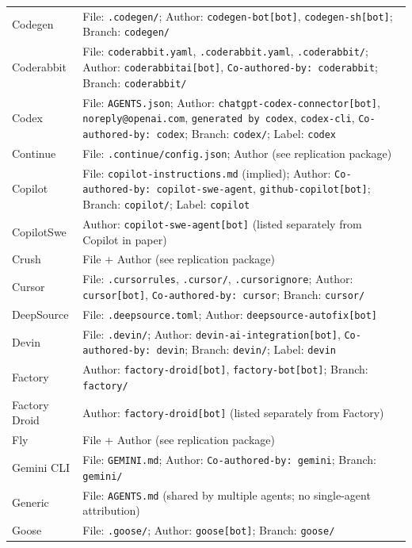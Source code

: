 \begin{small}
\begin{longtable}{@{}p{3.0cm}p{11.5cm}@{}}
Codegen          & File: \texttt{.codegen/}; Author: \texttt{codegen-bot[bot]}, \texttt{codegen-sh[bot]}; Branch: \texttt{codegen/} \\
Coderabbit       & File: \texttt{coderabbit.yaml}, \texttt{.coderabbit.yaml}, \texttt{.coderabbit/}; Author: \texttt{coderabbitai[bot]}, \texttt{Co-authored-by: coderabbit}; Branch: \texttt{coderabbit/} \\
Codex            & File: \texttt{AGENTS.json}; Author: \texttt{chatgpt-codex-connector[bot]}, \texttt{noreply@openai.com}, \texttt{generated by codex}, \texttt{codex-cli}, \texttt{Co-authored-by: codex}; Branch: \texttt{codex/}; Label: \texttt{codex} \\
Continue         & File: \texttt{.continue/config.json}; Author (see replication package) \\
Copilot          & File: \texttt{copilot-instructions.md} (implied); Author: \texttt{Co-authored-by: copilot-swe-agent}, \texttt{github-copilot[bot]}; Branch: \texttt{copilot/}; Label: \texttt{copilot} \\
CopilotSwe       & Author: \texttt{copilot-swe-agent[bot]} (listed separately from Copilot in paper) \\
Crush            & File + Author (see replication package) \\
Cursor           & File: \texttt{.cursorrules}, \texttt{.cursor/}, \texttt{.cursorignore}; Author: \texttt{cursor[bot]}, \texttt{Co-authored-by: cursor}; Branch: \texttt{cursor/} \\
DeepSource       & File: \texttt{.deepsource.toml}; Author: \texttt{deepsource-autofix[bot]} \\
Devin            & File: \texttt{.devin/}; Author: \texttt{devin-ai-integration[bot]}, \texttt{Co-authored-by: devin}; Branch: \texttt{devin/}; Label: \texttt{devin} \\
Factory          & Author: \texttt{factory-droid[bot]}, \texttt{factory-bot[bot]}; Branch: \texttt{factory/} \\
Factory Droid    & Author: \texttt{factory-droid[bot]} (listed separately from Factory) \\
Fly              & File + Author (see replication package) \\
Gemini CLI       & File: \texttt{GEMINI.md}; Author: \texttt{Co-authored-by: gemini}; Branch: \texttt{gemini/} \\
Generic          & File: \texttt{AGENTS.md} (shared by multiple agents; no single-agent attribution) \\
Goose            & File: \texttt{.goose/}; Author: \texttt{goose[bot]}; Branch: \texttt{goose/} \\

\end{longtable}
\end{small}
